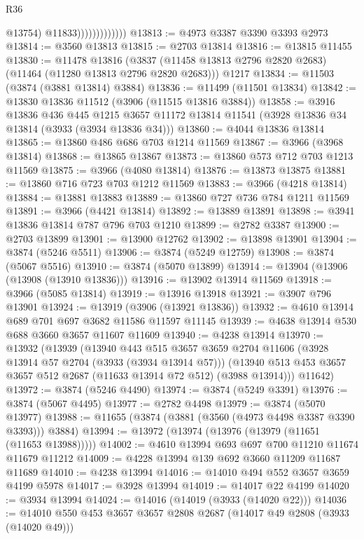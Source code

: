 \begin{lexlean}{R36}
\begin{coremodule}
                                @13754)
                              @11833)))))))))))))
@13813 := @4973 @3387 @3390 @3393 @2973
@13814 := @3560 @13813
@13815 := @2703 @13814
@13816 := @13815 @11455
@13830 := @11478
    @13816
    (@3837 (@11458 @13813 @2796 @2820 @2683) (@11464 (@11280 @13813 @2796 @2820 @2683)))
    @1217
@13834 := @11503 (@3874 (@3881 @13814) @3884)
@13836 := @11499 (@11501 @13834)
@13842 := @13830 @13836 @11512 (@3906 (@11515 @13816 @3884))
@13858 := @3916
    @13836
    @436
    @445
    @1215
    @3657
    @11172
    @13814
    @11541
    (@3928 @13836 @34 @13814 (@3933 (@3934 @13836 @34)))
@13860 := @4044 @13836 @13814
@13865 := @13860 @486 @686 @703 @1214 @11569
@13867 := @3966 (@3968 @13814)
@13868 := @13865 @13867
@13873 := @13860 @573 @712 @703 @1213 @11569
@13875 := @3966 (@4080 @13814)
@13876 := @13873 @13875
@13881 := @13860 @716 @723 @703 @1212 @11569
@13883 := @3966 (@4218 @13814)
@13884 := @13881 @13883
@13889 := @13860 @727 @736 @784 @1211 @11569
@13891 := @3966 (@4421 @13814)
@13892 := @13889 @13891
@13898 := @3941 @13836 @13814 @787 @796 @703 @1210
@13899 := @2782 @3387
@13900 := @2703 @13899
@13901 := @13900 @12762
@13902 := @13898 @13901
@13904 := @3874 (@5246 @5511)
@13906 := @3874 (@5249 @12759)
@13908 := @3874 (@5067 @5516)
@13910 := @3874 (@5070 @13899)
@13914 := @13904 (@13906 (@13908 (@13910 @13836)))
@13916 := @13902 @13914 @11569
@13918 := @3966 (@5085 @13814)
@13919 := @13916 @13918
@13921 := @3907 @796 @13901
@13924 := @13919 (@3906 (@13921 @13836))
@13932 := @4610 @13914 @689 @701 @697 @3682 @11586 @11597 @11145
@13939 := @4638 @13914 @530 @688 @3660 @3657 @11607 @11609
@13940 := @4238 @13914
@13970 := @13932
    (@13939
      (@13940
        @443
        @515
        @3657
        @3659
        @2704
        @11606
        (@3928 @13914 @57 @2704 (@3933 (@3934 @13914 @57)))
        (@13940 @513 @453 @3657 @3657 @512 @2687 (@11633 @13914 @72 @512) (@3988 @13914)))
      @11642)
@13972 := @3874 (@5246 @4490)
@13974 := @3874 (@5249 @3391)
@13976 := @3874 (@5067 @4495)
@13977 := @2782 @4498
@13979 := @3874 (@5070 @13977)
@13988 := @11655 (@3874 (@3881 (@3560 (@4973 @4498 @3387 @3390 @3393))) @3884)
@13994 := @13972 (@13974 (@13976 (@13979 (@11651 (@11653 @13988)))))
@14002 := @4610 @13994 @693 @697 @700 @11210 @11674 @11679 @11212
@14009 := @4228 @13994 @139 @692 @3660 @11209 @11687 @11689
@14010 := @4238 @13994
@14016 := @14010 @494 @552 @3657 @3659 @4199 @5978
@14017 := @3928 @13994
@14019 := @14017 @22 @4199
@14020 := @3934 @13994
@14024 := @14016 (@14019 (@3933 (@14020 @22)))
@14036 := @14010 @550 @453 @3657 @3657 @2808 @2687 (@14017 @49 @2808 (@3933 (@14020 @49)))

\end{coremodule}
\end{lexlean}
